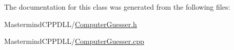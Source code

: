 The documentation for this class was generated from the following files\+:\begin{DoxyCompactItemize}
\item 
Mastermind\+C\+P\+P\+D\+L\+L/\hyperlink{_computer_guesser_8h}{Computer\+Guesser.\+h}\item 
Mastermind\+C\+P\+P\+D\+L\+L/\hyperlink{_computer_guesser_8cpp}{Computer\+Guesser.\+cpp}\end{DoxyCompactItemize}

